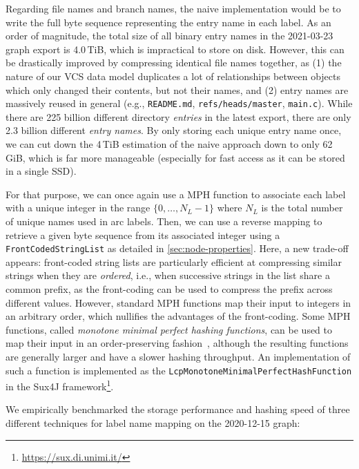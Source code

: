 Regarding file names and branch names, the naive implementation would be to
write the full byte sequence representing the entry name in each label. As an
order of magnitude, the total size of all binary entry names in the
2021-03-23 graph export is 4.0\,TiB, which is impractical to store on disk.
However, this can be drastically improved by compressing identical file names
together, as (1) the nature of our \gls{VCS} data model duplicates a lot of
relationships between objects which only changed their contents, but not their
names, and (2) entry names are massively reused in general (e.g.,
\texttt{README.md}, \texttt{refs/heads/master}, \texttt{main.c}).
While there are 225 billion different directory \emph{entries} in the
latest export, there are only 2.3 billion different \emph{entry names}.
By only storing each unique entry name once, we can cut down the 4\,TiB
estimation of the naive approach down to only 62\,GiB, which is far more
manageable (especially for fast access as it can be stored in a single SSD).

For that purpose, we can once again use a \gls{MPH} function to associate each
label with a unique integer in the range $\{0, \ldots, N_L-1\}$ where $N_L$ is
the total number of unique names used in arc labels. Then, we can use a reverse
mapping to retrieve a given byte sequence from its associated integer using a
\texttt{FrontCodedStringList} as detailed in \cref{sec:node-properties}.  Here,
a new trade-off appears: front-coded string lists are particularly efficient at
compressing similar strings when they are \emph{ordered}, i.e., when successive
strings in the list share a common prefix, as the front-coding can be used to
compress the prefix across different values. However, standard \gls{MPH}
functions map their input to integers in an arbitrary order, which nullifies
the advantages of the front-coding. Some \gls{MPH} functions, called
\emph{monotone minimal perfect hashing functions}, can be used to map their
input in an order-preserving fashion~\cite{belazzougui2008theory}, although the
resulting functions are generally larger and have a slower hashing throughput.
An implementation of such a function is implemented as the
\texttt{LcpMonotoneMinimalPerfectHashFunction} in the Sux4J
framework\footnote{\url{https://sux.di.unimi.it/}}.

We empirically benchmarked the storage performance and hashing speed of three
different techniques for label name mapping on the 2020-12-15 graph:

